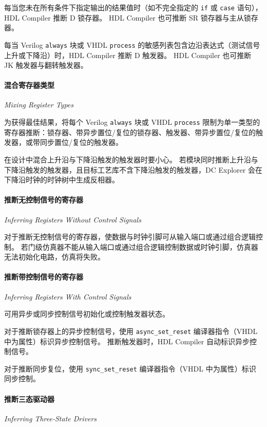 每当您未在所有条件下指定输出的结果值时（如不完全指定的 \texttt{if} 或 \texttt{case} 语句），HDL Compiler 推断 D 锁存器。
HDL Compiler 也可推断 SR 锁存器与主从锁存器。

每当 Verilog \texttt{always} 块或 VHDL \texttt{process} 的敏感列表包含边沿表达式（测试信号上升或下降沿）时，HDL Compiler 推断 D 触发器。
HDL Compiler 也可推断 JK 触发器与翻转触发器。

\paragraph{混合寄存器类型}
\textit{Mixing Register Types}

为获得最佳结果，将每个 Verilog \texttt{always} 块或 VHDL \texttt{process} 限制为单一类型的寄存器推断：锁存器、带异步置位/复位的锁存器、触发器、带异步置位/复位的触发器，或带同步置位/复位的触发器。

在设计中混合上升沿与下降沿触发的触发器时要小心。
若模块同时推断上升沿与下降沿触发的触发器，且目标工艺库不含下降沿触发的触发器，DC Explorer 会在下降沿时钟的时钟树中生成反相器。

\paragraph{推断无控制信号的寄存器}
\textit{Inferring Registers Without Control Signals}

对于推断无控制信号的寄存器，使数据与时钟引脚可从输入端口或通过组合逻辑控制。
若门级仿真器不能从输入端口或通过组合逻辑控制数据或时钟引脚，仿真器无法初始化电路，仿真将失败。

\paragraph{推断带控制信号的寄存器}
\textit{Inferring Registers With Control Signals}

可用异步或同步控制信号初始化或控制触发器状态。

对于推断锁存器上的异步控制信号，使用 \texttt{async\_set\_reset} 编译器指令（VHDL 中为属性）标识异步控制信号。
推断触发器时，HDL Compiler 自动标识异步控制信号。

对于推断同步复位，使用 \texttt{sync\_set\_reset} 编译器指令（VHDL 中为属性）标识同步控制。

\paragraph{推断三态驱动器}
\textit{Inferring Three-State Drivers}

